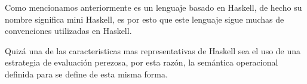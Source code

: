 \documentclass[12pt]{extarticle}
\begin{document}
Como mencionamos anteriormente \minhs es un lenguaje basado en {\sf Haskell}, de hecho su nombre significa mini {\sf Haskell}, es por esto que este lenguaje sigue muchas de convenciones utilizadas en {\sf Haskell}. 

Quizá una de las caracteristicas mas representativas de {\sf Haskell} sea el uso de una estrategia de evaluación perezosa, por esta razón, la semántica operacional definida para \minhs se define de esta misma forma.











\end{document}
